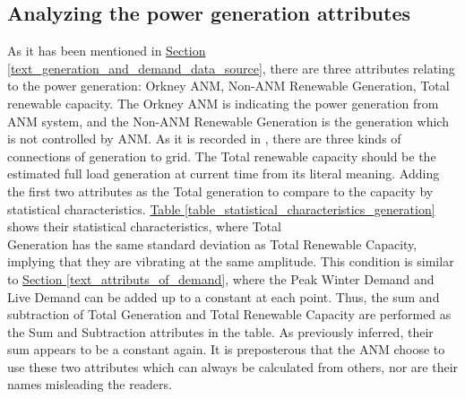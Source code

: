 \documentclass[12pt,a4paper]{report}
\begin{document}
                \subsection{Analyzing the power generation attributes}
                As it has been mentioned in \hyperref[text_generation_and_demand_data_source]{Section \ref*{text_generation_and_demand_data_source}}, there are three attributes relating to the power generation: Orkney ANM, Non-ANM Renewable Generation, Total renewable capacity. The Orkney ANM is indicating the power generation from ANM system, and the Non-ANM Renewable Generation is the generation which is not controlled by ANM. As it is recorded in \cite{report:OrkneyAudit}, there are three kinds of \\connections of generation to grid. The Total renewable capacity should be the estimated full load generation at current time from its literal meaning. Adding the first two attributes as the Total generation to compare to the capacity by statistical characteristics. \hyperref[table_statistical_characteristics_generation]{Table \ref*{table_statistical_characteristics_generation}} shows their statistical characteristics, where Total \\Generation has the same standard deviation as Total Renewable Capacity, implying that they are vibrating at the same amplitude. This condition is similar to \hyperref[text_attributs_of_demand]{Section \ref*{text_attributs_of_demand}}, where the Peak Winter Demand and Live Demand can be added up to a constant at each point. Thus, the sum and subtraction of Total Generation and Total Renewable Capacity are performed as the Sum and Subtraction attributes in the table. As previously inferred, their sum appears to be a constant again. It is preposterous that the ANM choose to use these two attributes which can always be calculated from others, nor are their names misleading the readers.
\end{document}
